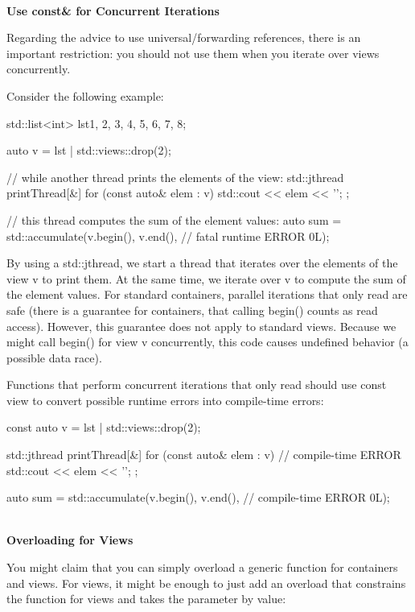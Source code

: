 \noindent
\hspace*{\fill} \\ %
\textbf{Use const\& for Concurrent Iterations}

Regarding the advice to use universal/forwarding references, there is an important restriction: you should not use them when you iterate over views concurrently.

Consider the following example:

\begin{cpp}
std::list<int> lst{1, 2, 3, 4, 5, 6, 7, 8};

auto v = lst | std::views::drop(2);

// while another thread prints the elements of the view:
std::jthread printThread{[&] {
		for (const auto& elem : v) {
			std::cout << elem << '\n';
		}
}};

// this thread computes the sum of the element values:
auto sum = std::accumulate(v.begin(), v.end(), // fatal runtime ERROR
0L);
\end{cpp}

By using a std::jthread, we start a thread that iterates over the elements of the view v to print them. At the same time, we iterate over v to compute the sum of the element values. For standard containers, parallel iterations that only read are safe (there is a guarantee for containers, that calling begin() counts as read access). However, this guarantee does not apply to standard views. Because we might call begin() for view v concurrently, this code causes undefined behavior (a possible data race).

Functions that perform concurrent iterations that only read should use const view to convert possible runtime errors into compile-time errors:

\begin{cpp}
const auto v = lst | std::views::drop(2);

std::jthread printThread{[&] {
		for (const auto& elem : v) { // compile-time ERROR
			std::cout << elem << '\n';
		}
}};

auto sum = std::accumulate(v.begin(), v.end(), // compile-time ERROR
0L);
\end{cpp}

\noindent
\hspace*{\fill} \\ %
\textbf{Overloading for Views}

You might claim that you can simply overload a generic function for containers and views. For views, it might be enough to just add an overload that constrains the function for views and takes the parameter by value:

